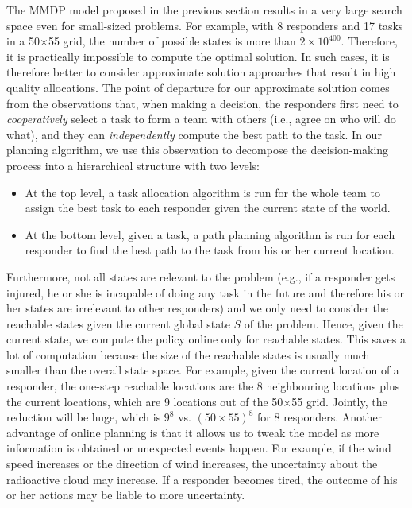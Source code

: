\noindent The  MMDP model proposed in the previous section results
in a very large search space even for small-sized problems. For
example, with 8 responders and 17 tasks in a 50$\times$55 grid, the
number of possible states is more than $2\times 10^{400}$.
Therefore, it is practically impossible to compute the optimal
solution. In such cases, it is therefore better to consider
approximate solution approaches that result in high quality
allocations.  The point of departure for our approximate solution
comes from the observations that, when making a decision, the
responders first need to {\em cooperatively} select a task to form
a team with others (i.e., agree on who will do what), and they can
{\em independently} compute the best path to the task. In our
planning algorithm, we use this observation to decompose the
decision-making process into a hierarchical structure with two
levels:
\begin{itemize}
  \itemsep=-2pt
  \item At the top level, a task allocation algorithm is run for
      the whole team to assign the best task to each responder
      given the current state of the world.
  \item At the bottom level, given a task, a path planning
      algorithm is run for each responder to find the best path
      to the task from his or her current location.
\end{itemize}

Furthermore, not all states are relevant to the problem (e.g., if a
responder gets injured, he or she is incapable of doing any task in
the future and therefore his or her states are irrelevant to other
responders) and we only need to consider the reachable states given
the current global state $S$ of the problem. Hence, given the
current state, we compute the policy online only for reachable
states. This saves a lot of computation because the size of the
reachable states is usually much smaller than the overall state
space. For example, given the current location of a responder, the
one-step reachable locations are the 8 neighbouring locations plus
the current locations, which are 9 locations out of the
50$\times$55 grid. Jointly, the reduction will be huge, which is
$9^8$ vs. $(50\times 55)^8$ for 8 responders. Another advantage of
online planning is that it allows us to tweak the model as more
information is obtained or unexpected events happen. For example,
if the wind speed increases or the direction of wind increases, the
uncertainty about the radioactive cloud may increase. If a
responder becomes tired, the outcome of his or her actions may be
liable to more uncertainty.

